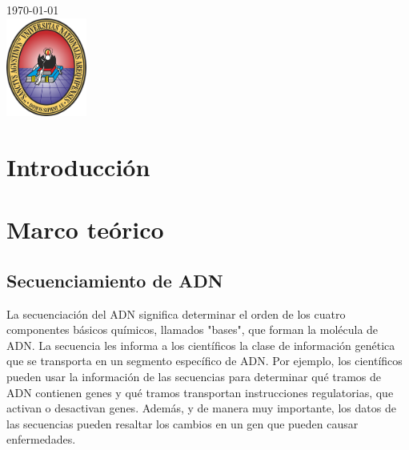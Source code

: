 \documentclass{article}
\begin{document}
\begin{titlepage}
	
	
	{\large \today}\\[2cm] %
	
	
	\includegraphics[width=100px, keepaspectratio]{img/unsa}\\[1cm] %
	
	
	\vfill %
	
\end{titlepage}	
	
	
	

	
	
\tableofcontents
\newpage	
	

	
\section{Introducción}

\section{Marco teórico}
	
\subsection{Secuenciamiento de ADN}
La secuenciación del ADN significa determinar el orden de los cuatro componentes básicos químicos, llamados "bases", que forman la molécula de ADN. La secuencia les informa a los científicos la clase de información genética que se transporta en un segmento específico de ADN. Por ejemplo, los científicos pueden usar la información de las secuencias para determinar qué tramos de ADN contienen genes y qué tramos transportan instrucciones regulatorias, que activan o desactivan genes. Además, y de manera muy importante, los datos de las secuencias pueden resaltar los cambios en un gen que pueden causar enfermedades.
\end{document}
